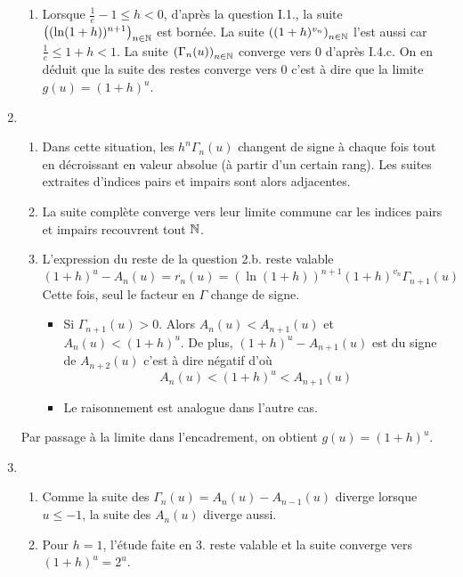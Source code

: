 \begin{enumerate}
\begin{enumerate}
\item Lorsque $\frac{1}{e}-1\leq h <0$, d'après la question I.1., la suite $\left( (\ln(1+h))^{n+1}\right) _{n\in \mathbb{N}}$ est bornée. La suite $\left( (1+h)^{v_n}\right) _{n\in \mathbb{N}}$ l'est aussi car $\frac{1}{e}\leq 1+h <1$. La suite $\left( \Gamma_n(u)\right) _{n\in \mathbb{N}}$ converge vers $0$ d'après I.4.c. On en déduit que la suite des restes converge vers $0$ c'est à dire que la limite $g(u)=(1+h)^u$.
\end{enumerate}
 
\item
\begin{enumerate}
\item Dans cette situation, les $h^n\Gamma_n(u)$ changent de signe à chaque fois tout en décroissant en valeur absolue (à partir d'un certain rang). Les suites extraites d'indices pairs et impairs sont alors adjacentes.
\item  La suite complète converge vers leur limite commune car les indices pairs et impairs recouvrent tout $\mathbb{N}$.
\item L'expression du reste de la question 2.b. reste valable
\begin{displaymath}
 (1+h)^u - A_n(u) = r_n(u) = (\ln(1+h))^{n+1}(1+h)^{v_n}\Gamma_{n+1}(u)
\end{displaymath}
Cette fois, seul le facteur en $\Gamma$ change de signe.
\begin{itemize}
 \item Si $\Gamma_{n+1}(u)>0$. Alors $A_n(u)<A_{n+1}(u)$ et $A_n(u)< (1+h)^u$.\newline
 De plus, $(1+h)^u - A_{n+1}(u)$ est du signe de $A_{n+2}(u)$ c'est à dire négatif d'où
\begin{displaymath}
 A_n(u)< (1+h)^u < A_{n+1}(u)
\end{displaymath}
 \item Le raisonnement est analogue dans l'autre cas.
\end{itemize}
\end{enumerate}
Par passage à la limite dans l'encadrement, on obtient $g(u)=(1+h)^u$.
\item
\begin{enumerate}
\item Comme la suite des $\Gamma_n(u) = A_n(u) - A_{n-1}(u)$ diverge lorsque $u\leq-1$, la suite des $A_n(u)$ diverge aussi.
\item Pour $h=1$, l'étude faite en 3. reste valable et la suite converge vers $(1+h)^u = 2^u$.
\end{enumerate}
\end{enumerate}
